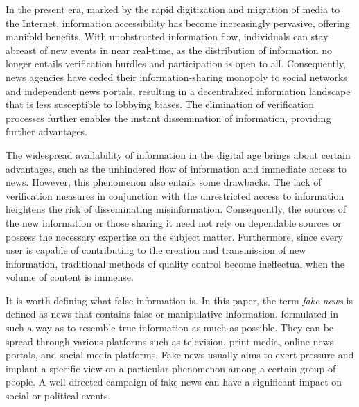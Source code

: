 In the present era, marked by the rapid digitization and migration of media to the Internet, information accessibility has become increasingly pervasive, offering manifold benefits. With unobstructed information flow, individuals can stay abreast of new events in near real-time, as the distribution of information no longer entails verification hurdles and participation is open to all. Consequently, news agencies have ceded their information-sharing monopoly to social networks and independent news portals, resulting in a decentralized information landscape that is less susceptible to lobbying biases. The elimination of verification processes further enables the instant dissemination of information, providing further advantages.

The widespread availability of information in the digital age brings about certain advantages, such as the unhindered flow of information and immediate access to news. However, this phenomenon also entails some drawbacks. The lack of verification measures in conjunction with the unrestricted access to information heightens the risk of disseminating misinformation. Consequently, the sources of the new information or those sharing it need not rely on dependable sources or possess the necessary expertise on the subject matter. Furthermore, since every user is capable of contributing to the creation and transmission of new information, traditional methods of quality control become ineffectual when the volume of content is immense.

It is worth defining what false information is. In this paper, the term \textit{fake news} is defined as news that contains false or manipulative information, formulated in such a way as to resemble true information as much as possible. They can be spread through various platforms such as television, print media, online news portals, and social media platforms. Fake news usually aims to exert pressure and implant a specific view on a particular phenomenon among a certain group of people. A well-directed campaign of fake news can have a significant impact on social or political events.


